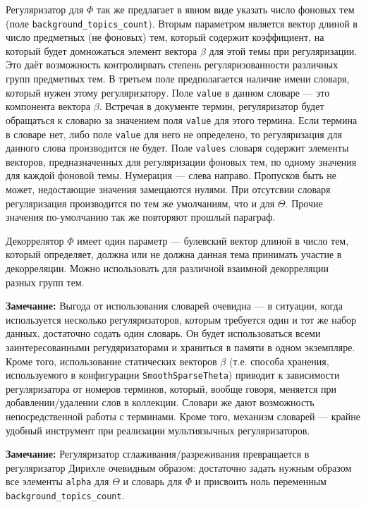 Регуляризатор для $\Phi$ так же предлагает в явном виде указать число фоновых тем (поле \verb|background_topics_count|). 
Вторым параметром является вектор длиной в число предметных (не фоновых) тем, который содержит коэффициент, на который будет домножаться элемент вектора $\beta$ для этой темы при регуляризации. Это даёт возможность контролирвать степень регуляризованности различных групп предметных тем. 
В третьем поле предполагается наличие имени словаря, который нужен этому регуляризатору. Поле \verb|value| в данном словаре --- это компонента вектора $\beta$. Встречая в документе термин, регуляризатор будет обращаться к словарю за значением поля \verb|value| для этого термина. Если термина в словаре нет, либо поле \verb|value| для него не определено, то регуляризация для данного слова производится не будет. Поле \verb|values| словаря содержит элементы векторов, предназначенных для регуляризации фоновых тем, по одному значения для каждой фоновой темы. Нумерация --- слева направо. Пропусков быть не может, недостающие значения замещаются нулями. При отсутсвии словаря регуляризация производится по тем же умолчаниям, что и для $\Theta$. Прочие значения по-умолчанию так же повторяют прошлый параграф.

Декоррелятор $\Phi$ имеет один параметр --- булевский вектор длиной в число тем, который определяет, должна или не должна данная тема принимать участие в декорреляции. Можно использовать для различной взаимной декорреляции разных групп тем.

{\bf Замечание:} Выгода от использования словарей очевидна --- в ситуации, когда используется несколько регуляризаторов, которым требуется один и тот же набор данных, достаточно содать один словарь. Он будет использоваться всеми заинтересованными регудяризаторами и храниться в памяти в одном экземпляре. Кроме того, использование статических векторов $\beta$ (т.е. способа хранения, используемого в конфигурации \verb|SmoothSparseTheta|) приводит к зависимости регуляризатора от номеров терминов, который, вообще говоря, меняется при добавлении/удалении слов в коллекции. Словари же дают возможность непосредственной работы с терминами. Кроме того, механизм словарей --- крайне удобный инструмент при реализации мультиязычных регуляризаторов.

{\bf Замечание:} Регуляризатор сглаживания/разреживания превращается в регуляризатор Дирихле очевидным образом: достаточно задать нужным образом все элементы \verb|alpha| для $\Theta$ и словарь для $\Phi$ и присвоить ноль переменным \verb|background_topics_count|.

